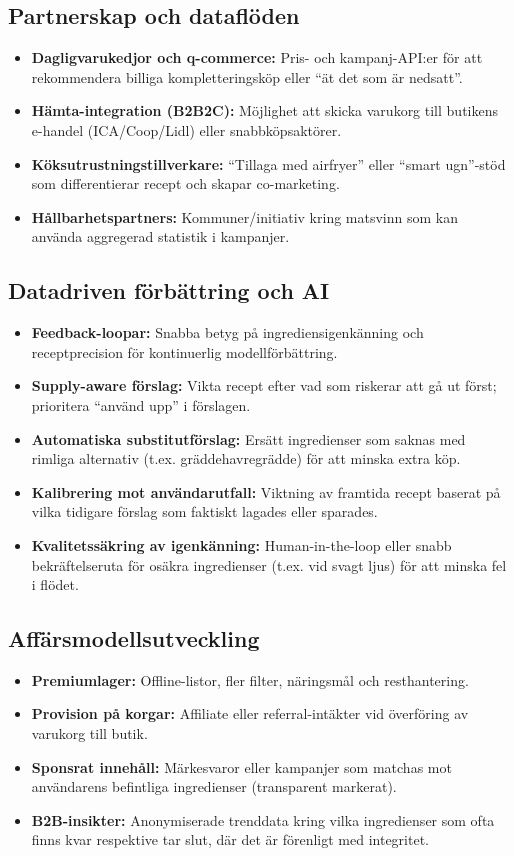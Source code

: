 \documentclass[a4paper,12pt]{article}
\begin{document}
\subsection{Partnerskap och dataflöden}
\begin{itemize}
    \item \textbf{Dagligvarukedjor och q-commerce:} Pris- och kampanj-API:er för att rekommendera billiga kompletteringsköp eller “ät det som är nedsatt”.
    \item \textbf{Hämta-integration (B2B2C):} Möjlighet att skicka varukorg till butikens e-handel (ICA/Coop/Lidl) eller snabbköpsaktörer.
    \item \textbf{Köksutrustningstillverkare:} “Tillaga med airfryer” eller “smart ugn”-stöd som differentierar recept och skapar co-marketing.
    \item \textbf{Hållbarhetspartners:} Kommuner/initiativ kring matsvinn som kan använda aggregerad statistik i kampanjer.
\end{itemize}

\subsection{Datadriven förbättring och AI}
\begin{itemize}
    \item \textbf{Feedback-loopar:} Snabba betyg på ingrediensigenkänning och receptprecision för kontinuerlig modellförbättring.
    \item \textbf{Supply-aware förslag:} Vikta recept efter vad som riskerar att gå ut först; prioritera “använd upp” i förslagen.
    \item \textbf{Automatiska substitutförslag:} Ersätt ingredienser som saknas med rimliga alternativ (t.ex. grädde\rightarrow{}havregrädde) för att minska extra köp.
    \item \textbf{Kalibrering mot användarutfall:} Viktning av framtida recept baserat på vilka tidigare förslag som faktiskt lagades eller sparades.
    \item \textbf{Kvalitetssäkring av igenkänning:} Human-in-the-loop eller snabb bekräftelseruta för osäkra ingredienser (t.ex. vid svagt ljus) för att minska fel i flödet.
\end{itemize}

\subsection{Affärsmodellsutveckling}
\begin{itemize}
    \item \textbf{Premiumlager:} Offline-listor, fler filter, näringsmål och resthantering.
    \item \textbf{Provision på korgar:} Affiliate eller referral-intäkter vid överföring av varukorg till butik.
    \item \textbf{Sponsrat innehåll:} Märkesvaror eller kampanjer som matchas mot användarens befintliga ingredienser (transparent markerat).
    \item \textbf{B2B-insikter:} Anonymiserade trenddata kring vilka ingredienser som ofta finns kvar respektive tar slut, där det är förenligt med integritet.
\end{itemize}
\end{document}
